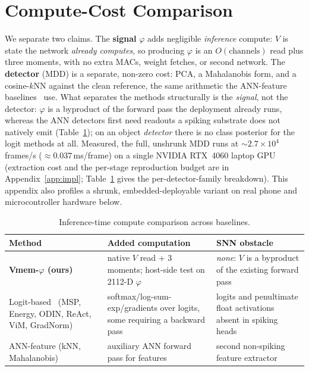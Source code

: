 ﻿\documentclass{article} %
\theoremstyle{remark}
\begin{document}
\section{Compute-Cost Comparison}
\label{app:compute}
\label{sec:hardware}
We separate two claims. The \textbf{signal} $\varphi$ adds negligible \emph{inference} compute: $V$
is state the network \emph{already computes}, so producing $\varphi$ is an $O(\text{channels})$ read
plus three moments, with no extra MACs, weight fetches, or second network. The \textbf{detector}
(MDD) is a separate, non-zero cost: PCA, a Mahalanobis form, and a cosine-$k$NN against the clean
reference, the same arithmetic the ANN-feature baselines~\citep{lee2018mahalanobis,sun2022knn} use.
What separates the methods structurally is the \emph{signal}, not the detector: $\varphi$ is a
byproduct of the forward pass the deployment already runs, whereas the ANN detectors first need
readouts a spiking substrate does not natively emit (Table~\ref{tab:hardware}); on an object
\emph{detector} there is no class posterior for the logit methods at all. Measured, the full,
unshrunk MDD runs at $\sim\!2.7\times10^4$ frames/s ($\approx 0.037$\,ms/frame) on a single NVIDIA
RTX~4060 laptop GPU (extraction cost and the per-stage reproduction budget are in
Appendix~\ref{app:impl}; Table~\ref{tab:hardware} gives the per-detector-family breakdown). This
appendix also profiles a shrunk, embedded-deployable variant on real phone and microcontroller
hardware below.

\begin{table}[t]
  \centering\small
  \caption{Inference-time compute comparison across baselines.}
  \label{tab:hardware}
  \begin{tabularx}{\linewidth}{@{}>{\raggedright}X >{\raggedright}X >{\raggedright\arraybackslash}X@{}}
    \toprule
    Method & Added computation & SNN obstacle \\
    \midrule
    \textbf{Vmem-$\varphi$ (ours)}
      & native $V$ read + 3 moments; host-side test on 2112-D $\varphi$
      & \textit{none}: $V$ is a byproduct of the existing forward pass \\
    Logit-based~\citep{hendrycks2017msp,liu2020energy,
      liang2018odin,sun2021react,wang2022vim,huang2021gradnorm} (MSP, Energy, ODIN, ReAct, ViM, GradNorm)
      & softmax/log-sum-exp/gradients over logits, some requiring a backward pass
      & logits and penultimate float activations absent in spiking heads \\
    ANN-feature (kNN, Mahalanobis)~\citep{lee2018mahalanobis,sun2022knn}
      & auxiliary ANN forward pass for features
      & second non-spiking feature extractor \\
    \bottomrule
  \end{tabularx}
\end{table}
\end{document}
